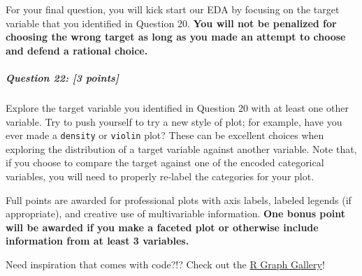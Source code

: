 \documentclass[
]{article}
\begin{document}
For your final question, you will kick start our EDA by focusing on the
target variable that you identified in Question 20. \textbf{You will not
be penalized for choosing the wrong target as long as you made an
attempt to choose and defend a rational choice.}

\subparagraph{\texorpdfstring{\textbf{Question 22}: {[}3
points{]}}{Question 22: {[}3 points{]}}}\label{question-22-3-points}

Explore the target variable you identified in Question 20 with at least
one other variable. Try to push yourself to try a new style of plot; for
example, have you ever made a \texttt{density} or \texttt{violin} plot?
These can be excellent choices when exploring the distribution of a
target variable against another variable. Note that, if you choose to
compare the target against one of the encoded categorical variables, you
will need to properly re-label the categories for your plot.

Full points are awarded for professional plots with axis labels, labeled
legends (if appropriate), and creative use of multivariable information.
\textbf{One bonus point will be awarded if you make a faceted plot or
otherwise include information from at least 3 variables.}

Need inspiration that comes with code?!? Check out the
\href{https://r-graph-gallery.com}{R Graph Gallery}!
\end{document}
